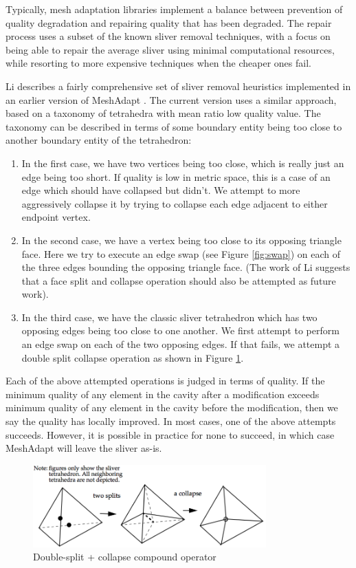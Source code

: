 Typically, mesh adaptation libraries implement a balance
between prevention of quality degradation and repairing
quality that has been degraded.
The repair process uses a subset of the known sliver removal
techniques, with a focus on being able to repair the average
sliver using minimal computational resources, while resorting
to more expensive techniques when the cheaper ones fail.

Li describes a fairly comprehensive set of sliver removal
heuristics implemented in an earlier version of MeshAdapt
\cite{li2003mesh}.
The current version uses a similar approach, based on a
taxonomy of tetrahedra with mean ratio low quality value.
The taxonomy can be described in terms of some boundary
entity being too close to another boundary entity
of the tetrahedron:
\begin{enumerate}
\item In the first case, we have two vertices being too
close, which is really just an edge being too short.
If quality is low in metric space, this is a case
of an edge which should have collapsed but didn't.
We attempt to more aggressively collapse it by trying
to collapse each edge adjacent to either endpoint vertex.
\item In the second case, we have a vertex being too close
to its opposing triangle face.
Here we try to execute an edge swap (see Figure \ref{fig:swap})
on each of the three edges bounding the opposing triangle face.
(The work of Li suggests that a face split and collapse operation
should also be attempted as future work).
\item In the third case, we have the classic sliver tetrahedron
which has two opposing edges being too close to one another.
We first attempt to perform an edge swap on each of the two
opposing edges.
If that fails, we attempt a double split collapse operation
as shown in Figure \ref{fig:compound}.
\end{enumerate}
Each of the above attempted operations is judged in terms of quality.
If the minimum quality of any element in the cavity after a modification
exceeds minimum quality of any element in the cavity before the
modification, then we say the quality has locally improved.
In most cases, one of the above attempts succeeds.
However, it is possible in practice for none to succeed, in which
case MeshAdapt will leave the sliver as-is.

\begin{figure}
\begin{center}
\includegraphics[width=0.8\textwidth]{split_collapse.png}
\caption{Double-split + collapse compound operator
\cite{li2003mesh}}
\label{fig:compound}
\end{center}
\end{figure}

